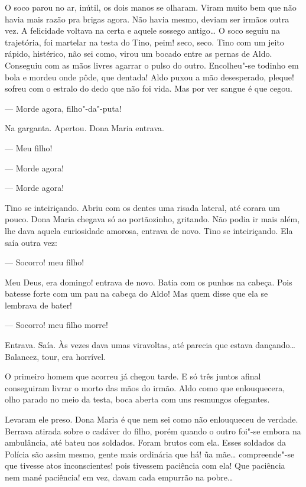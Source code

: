 O soco parou no ar, inútil, os dois manos se olharam. Viram muito bem
que não havia mais razão pra brigas agora. Não havia mesmo, deviam ser
irmãos outra vez. A felicidade voltava na certa e aquele sossego
antigo\ldots{} O soco seguiu na trajetória, foi martelar na testa do Tino,
peim! seco, seco. Tino com um jeito rápido, histérico, não sei como,
virou um bocado entre as pernas de Aldo. Conseguiu com as mãos livres
agarrar o pulso do outro. Encolheu"-se todinho em bola e mordeu onde
pôde, que dentada! Aldo puxou a mão desesperado, pleque! sofreu com o
estralo do dedo que não foi vida. Mas por ver sangue é que cegou.

--- Morde agora, filho"-da"-puta!

Na garganta. Apertou. Dona Maria entrava. 

--- Meu filho!

--- Morde agora!


--- Morde agora!

Tino se inteiriçando. Abriu com os dentes uma risada lateral, até corara
um pouco. Dona Maria chegava só ao portãozinho, gritando. Não podia ir
mais além, lhe dava aquela curiosidade amorosa, entrava de novo. Tino se
inteiriçando. Ela saía outra vez:

--- Socorro! meu filho!

Meu Deus, era domingo! entrava de novo. Batia com os punhos na cabeça.
Pois batesse forte com um pau na cabeça do Aldo! Mas quem disse que ela
se lembrava de bater!

--- Socorro! meu filho morre!

Entrava. Saía. Às vezes dava umas viravoltas, até parecia que estava
dançando\ldots{} Balancez, tour, era horrível.

O primeiro homem que acorreu já chegou tarde. E só três juntos afinal
conseguiram livrar o morto das mãos do irmão. Aldo como que
enlouquecera, olho parado no meio da testa, boca aberta com uns
resmungos ofegantes.

Levaram ele preso. Dona Maria é que nem sei como não enlouqueceu de
verdade. Berrava atirada sobre o cadáver do filho, porém quando o outro
foi"-se embora na ambulância, até bateu nos soldados. Foram brutos com
ela. Esses soldados da Polícia são assim mesmo, gente mais ordinária que
há! ũa mãe\ldots{} compreende"-se que tivesse atos inconscientes! pois
tivessem paciência com ela! Que paciência nem mané paciência! em vez,
davam cada empurrão na pobre\ldots{}

